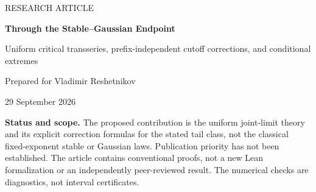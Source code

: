\documentclass[11pt,a4paper]{article}
\numberwithin{equation}{section}
\theoremstyle{definition}
\theoremstyle{remark}
\newcommand{\eps}{\varepsilon}
\newcommand{\ee}{\mathrm e}
\begin{document}
\hypersetup{pageanchor=false}
\begin{titlepage}
\vspace*{9mm}
{\color{teal}\large RESEARCH ARTICLE\par}
\vspace{8mm}
{\color{navy}\LARGE\bfseries Through the Stable--Gaussian Endpoint\par}
\vspace{5mm}
{\Large Uniform critical transseries, prefix-independent cutoff corrections, and conditional extremes\par}
\vspace{9mm}
{\large Prepared for Vladimir Reshetnikov\par}
{29 September 2026\par}
\vspace{9mm}
\begin{abstract}
We study the critical countable-action equation
\(U(q)=\sum_{j\ge1}w_jq^j\ee^{jU(q)}\), with nonnegative weights,
\(\sum jw_j=1\), and an eventually exact tail
\(w_j=c_{\eps}j^{-3+\eps}\). The tail exponent approaches two while
\(|\eps|\log n\) remains bounded. This is the joint-limit question explicitly
left open in the companion marginal-critical manuscript. We prove a uniform,
pole-cancelled inverse representation and a convergent correction chart about
a deformed Lambert core. A direct Fourier argument gives the complete central
coefficient through its first correction and a uniform local limit theorem.
For action cutoffs we obtain a two-term formula in which all finite-prefix
constants cancel. It yields a two-term minimal-budget formula and the exact
criterion for asymptotically lossless truncation. Conditioned on the coefficient
constraint, the rescaled large actions converge to a Poisson point process.
The analysis works from both sides of the endpoint, including a triangular
finite-variance regime in which the total variance is not the correct central
normalization. Proofs are self-contained apart from explicitly identified
classical analytic identities; reproducible algebraic and numerical checks
are supplied.
\end{abstract}
\vfill
\small
\textbf{Status and scope.} The proposed contribution is the uniform joint-limit
theory and its explicit correction formulas for the stated tail class, not the
classical fixed-exponent stable or Gaussian laws. Publication priority has not
been established. The article contains conventional proofs, not a new Lean
formalization or an independently peer-reviewed result. The numerical checks
are diagnostics, not interval certificates.
\end{titlepage}
\hypersetup{pageanchor=true}
\tableofcontents
\clearpage
\end{document}
